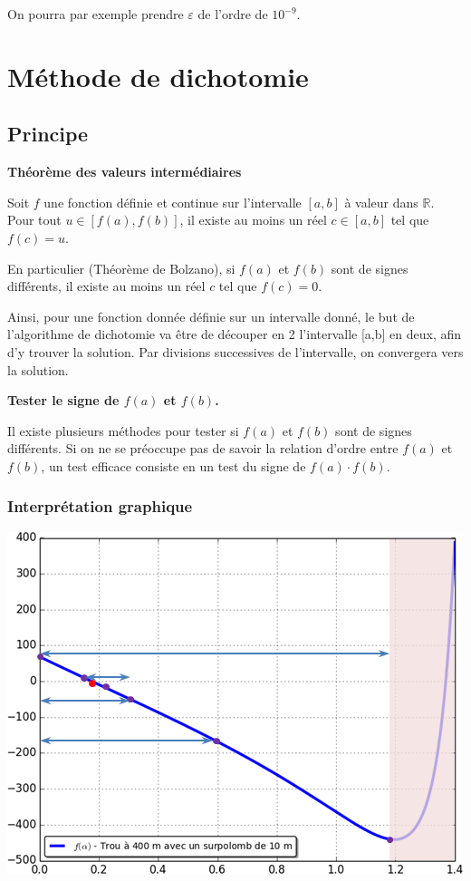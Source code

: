 \documentclass[10pt,fleqn]{article} %
\begin{document}
On pourra par exemple prendre $\varepsilon$ de l'ordre de $10^{-9}$.

\section{Méthode de dichotomie}

\subsection{Principe}
\begin{theorem}
\textbf{Théorème des valeurs intermédiaires}

Soit $f$ une fonction définie et continue sur l'intervalle $[a,b]$ à valeur dans $\mathbb{R}$. Pour tout $u\in[f(a),f(b)]$, il existe au moins un réel $c\in [a,b]$  tel que $f(c)=u$.

 En particulier (Théorème de Bolzano), si $f(a)$ et $f(b)$ sont de signes différents, il existe au moins un réel $c$ tel que $f(c)=0$. 
\end{theorem}

Ainsi, pour une fonction donnée définie sur un intervalle donné, le but de l'algorithme de dichotomie va être de découper en 2 l'intervalle [a,b] en deux, afin d'y trouver la solution. Par divisions successives de l'intervalle, on convergera vers la solution.

\begin{rem}
\textbf{Tester le signe de $f(a)$ et $f(b)$.}

Il existe plusieurs méthodes pour tester si $f(a)$ et $f(b)$ sont de signes différents. Si on ne se préoccupe pas de savoir la relation d'ordre entre $f(a)$ et $f(b)$, un test efficace consiste en un test du signe de $f(a)\cdot f(b)$. 
\end{rem}

\subsubsection*{Interprétation graphique}

\begin{center}
\includegraphics[width=.6\textwidth]{images/InterpretationG}
\end{center}
\end{document}
